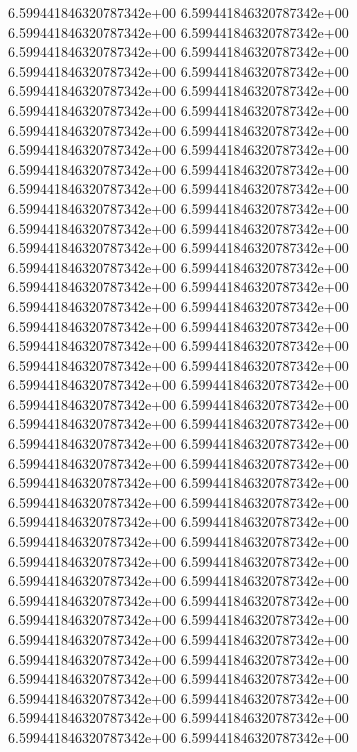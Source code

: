 6.599441846320787342e+00	6.599441846320787342e+00	6.599441846320787342e+00	6.599441846320787342e+00	6.599441846320787342e+00	6.599441846320787342e+00	6.599441846320787342e+00	6.599441846320787342e+00	6.599441846320787342e+00	6.599441846320787342e+00	6.599441846320787342e+00	6.599441846320787342e+00	6.599441846320787342e+00	6.599441846320787342e+00	6.599441846320787342e+00	6.599441846320787342e+00	6.599441846320787342e+00	6.599441846320787342e+00	6.599441846320787342e+00	6.599441846320787342e+00	6.599441846320787342e+00	6.599441846320787342e+00	6.599441846320787342e+00	6.599441846320787342e+00	6.599441846320787342e+00	6.599441846320787342e+00	6.599441846320787342e+00	6.599441846320787342e+00	6.599441846320787342e+00	6.599441846320787342e+00	6.599441846320787342e+00	6.599441846320787342e+00	6.599441846320787342e+00	6.599441846320787342e+00	6.599441846320787342e+00	6.599441846320787342e+00	6.599441846320787342e+00	6.599441846320787342e+00	6.599441846320787342e+00	6.599441846320787342e+00	6.599441846320787342e+00	6.599441846320787342e+00	6.599441846320787342e+00	6.599441846320787342e+00	6.599441846320787342e+00	6.599441846320787342e+00	6.599441846320787342e+00	6.599441846320787342e+00	6.599441846320787342e+00	6.599441846320787342e+00	6.599441846320787342e+00	6.599441846320787342e+00	6.599441846320787342e+00	6.599441846320787342e+00	6.599441846320787342e+00	6.599441846320787342e+00	6.599441846320787342e+00	6.599441846320787342e+00	6.599441846320787342e+00	6.599441846320787342e+00	6.599441846320787342e+00	6.599441846320787342e+00	6.599441846320787342e+00	6.599441846320787342e+00	6.599441846320787342e+00	6.599441846320787342e+00	6.599441846320787342e+00	6.599441846320787342e+00	6.599441846320787342e+00	6.599441846320787342e+00	6.599441846320787342e+00	6.599441846320787342e+00	6.599441846320787342e+00	6.599441846320787342e+00	6.599441846320787342e+00	6.599441846320787342e+00
